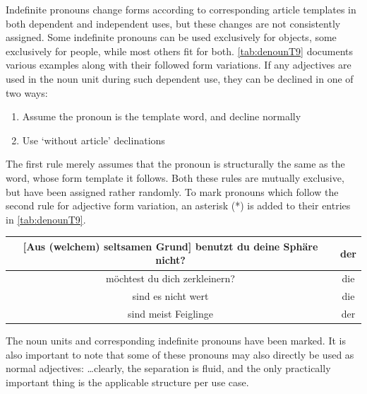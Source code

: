Indefinite pronouns change forms according to corresponding article templates in both dependent and independent uses, but these changes are not consistently assigned. Some indefinite pronouns  can be used exclusively for objects, some exclusively for people, while most others fit for both. \autoref{tab:denounT9} documents various examples along with their followed  form variations. If any adjectives are used in the noun unit during such dependent use, they can be  declined in one of two ways:
\begin{enumerate}
    \item Assume the pronoun is the template word, and decline normally
    \item Use `without article' declinations
\end{enumerate}
The first rule merely assumes that the pronoun is structurally the same as the word, whose form template it follows. Both these rules are mutually exclusive, but have been assigned rather randomly. To mark pronouns which follow the second rule for adjective form variation, an asterisk (*) is added to their entries in \autoref{tab:denounT9}.
\begin{example}
    \begin{tabular}{c|c}
        [Aus (welchem) seltsamen Grund] benutzt du deine Sphäre nicht? & der\\\hline
        [Für (welche) seelische Flamme] möchtest du dich zerkleinern? & die\\\hline
        [(Manche) teuere Flaschen] sind es nicht wert & die \\\hline
        [(Solche) einzelne Menschen] sind meist Feiglinge & der
    \end{tabular}
\end{example}
The noun units and corresponding indefinite pronouns have been marked. It is also important to note that some of these pronouns may also directly be used as normal adjectives: \ldots clearly, the separation is fluid, and the only practically important thing is the applicable structure per use case.
